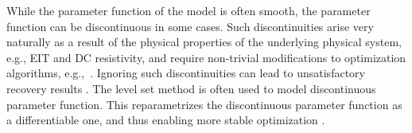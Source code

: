 \medskip{}
While the parameter function of the model is often smooth, the parameter
function can be discontinuous in some cases.
Such discontinuities arise very naturally as a result of the physical properties
of the underlying physical system, e.g., EIT and DC resistivity, and require
non-trivial modifications to optimization algorithms, e.g.,~\cite{rodoas1,
doas12}. 
Ignoring such discontinuities can lead to unsatisfactory recovery results
\cite{tali,doas12,doasleit2010}.
The level set method \cite{osse} is often used to model discontinuous parameter
function.
This reparametrizes the discontinuous parameter function as a differentiable
one, and thus enabling more stable optimization \cite{doasleit2010}.
